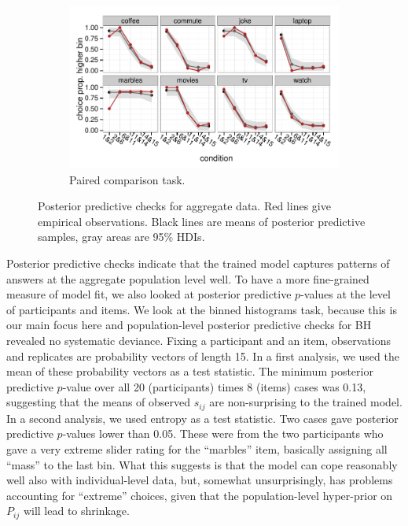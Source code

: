\documentclass[10pt,letterpaper]{article}
\newcommand{\citep}[1]{\cite{#1}}
\begin{document}
\begin{figure}
  \begin{subfigure}[b]{0.5\textwidth}
    \includegraphics[width = \textwidth]{plots/ppc_choice.pdf}
    \caption{Paired comparison task.}
    \label{fig:lightingPPC}
  \end{subfigure}

  \caption{Posterior predictive checks for aggregate data. Red lines give empirical
    observations. Black lines are means of posterior predictive samples, gray areas are
    95\% HDIs.}
  \label{fig:PPCs}
\end{figure}

Posterior predictive checks indicate that the trained model captures patterns of answers at the
aggregate population level well. To have a more fine-grained measure of model fit, we also
looked at posterior predictive $p$-values \citep{GelmanCarlin2014:Bayesian-Data-A} at the level
of participants and items. We look at the binned histograms task, because this is our main
focus here and population-level posterior predictive checks for BH revealed no systematic
deviance. Fixing a participant and an item, observations and replicates are probability vectors
of length 15. In a first analysis, we used the mean of these probability vectors as a test
statistic. The minimum posterior predictive $p$-value over all 20 (participants) times 8
(items) cases was 0.13, suggesting that the means of observed $s_{ij}$ are non-surprising to
the trained model. In a second analysis, we used entropy as a test statistic. Two cases gave
posterior predictive $p$-values lower than 0.05. These were from the two participants who gave
a very extreme slider rating for the ``marbles'' item, basically assigning all ``mass'' to the
last bin. What this suggests is that the model can cope reasonably well also with
individual-level data, but, somewhat unsurprisingly, has problems accounting for ``extreme''
choices, given that the population-level hyper-prior on $P_{ij}$ will lead to shrinkage.
\end{document}

